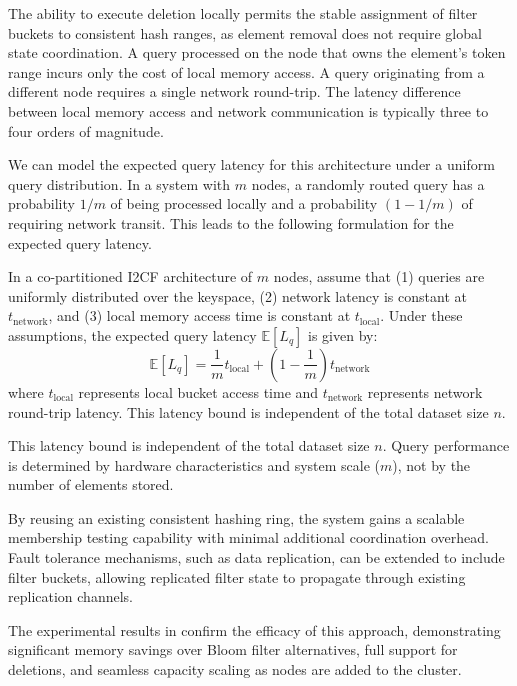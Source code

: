 The ability to execute deletion locally permits the stable assignment of filter buckets to consistent hash ranges, as element removal does not require global state coordination. A query processed on the node that owns the element's token range incurs only the cost of local memory access. A query originating from a different node requires a single network round-trip. The latency difference between local memory access and network communication is typically three to four orders of magnitude.

We can model the expected query latency for this architecture under a uniform query distribution. In a system with $m$ nodes, a randomly routed query has a probability $1/m$ of being processed locally and a probability $(1 - 1/m)$ of requiring network transit. This leads to the following formulation for the expected query latency.

\begin{theorem} \label{thm:co-partitioned-latency}
    In a co-partitioned I2CF architecture of $m$ nodes, assume that (1) queries are uniformly distributed over the keyspace, (2) network latency is constant at $t_{\text{network}}$, and (3) local memory access time is constant at $t_{\text{local}}$. Under these assumptions, the expected query latency $\mathbb{E}[L_q]$ is given by:
    \begin{equation*}
        \mathbb{E}[L_q] = \frac{1}{m} t_{\text{local}} + \left(1 - \frac{1}{m}\right) t_{\text{network}}
    \end{equation*}
    where $t_{\text{local}}$ represents local bucket access time and $t_{\text{network}}$ represents network round-trip latency. This latency bound is independent of the total dataset size $n$.
\end{theorem}

This latency bound is independent of the total dataset size $n$. Query performance is determined by hardware characteristics and system scale ($m$), not by the number of elements stored.

By reusing an existing consistent hashing ring, the system gains a scalable membership testing capability with minimal additional coordination overhead. Fault tolerance mechanisms, such as data replication, can be extended to include filter buckets, allowing replicated filter state to propagate through existing replication channels.

The experimental results in \cite{Luo2018DistributedDC} confirm the efficacy of this approach, demonstrating significant memory savings over Bloom filter alternatives, full support for deletions, and seamless capacity scaling as nodes are added to the cluster.

